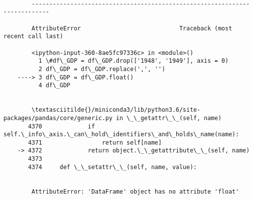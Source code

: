 \documentclass[11pt]{article}
\begin{document}
    \begin{Verbatim}[commandchars=\\\{\}]

        ---------------------------------------------------------------------------

        AttributeError                            Traceback (most recent call last)

        <ipython-input-360-8ae5fc97336c> in <module>()
          1 \#df\_GDP = df\_GDP.drop(['1948', '1949'], axis = 0)
          2 df\_GDP = df\_GDP.replace(',', '')
    ----> 3 df\_GDP = df\_GDP.float()
          4 df\_GDP


        \textasciitilde{}/miniconda3/lib/python3.6/site-packages/pandas/core/generic.py in \_\_getattr\_\_(self, name)
       4370             if self.\_info\_axis.\_can\_hold\_identifiers\_and\_holds\_name(name):
       4371                 return self[name]
    -> 4372             return object.\_\_getattribute\_\_(self, name)
       4373 
       4374     def \_\_setattr\_\_(self, name, value):


        AttributeError: 'DataFrame' object has no attribute 'float'

    \end{Verbatim}


    
    
    
    
\end{document}
